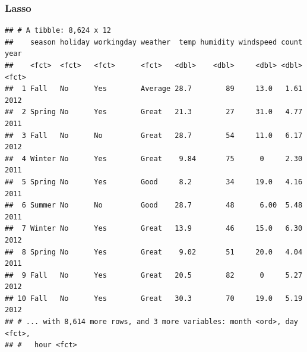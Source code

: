 \documentclass[american,]{article}
\newenvironment{Shaded}{\begin{snugshade}}{\end{snugshade}}
\newcommand{\DecValTok}[1]{\textcolor[rgb]{0.00,0.00,0.81}{#1}}
\newcommand{\FloatTok}[1]{\textcolor[rgb]{0.00,0.00,0.81}{#1}}
\newcommand{\KeywordTok}[1]{\textcolor[rgb]{0.13,0.29,0.53}{\textbf{#1}}}
\newcommand{\NormalTok}[1]{#1}
\newcommand{\OperatorTok}[1]{\textcolor[rgb]{0.81,0.36,0.00}{\textbf{#1}}}
\newcommand{\OtherTok}[1]{\textcolor[rgb]{0.56,0.35,0.01}{#1}}
\newcommand{\StringTok}[1]{\textcolor[rgb]{0.31,0.60,0.02}{#1}}
\begin{document}
\hypertarget{lasso}{%
\subsubsection{Lasso}\label{lasso}}

\begin{Shaded}
\end{Shaded}

\begin{verbatim}
## # A tibble: 8,624 x 12
##    season holiday workingday weather  temp humidity windspeed count year 
##    <fct>  <fct>   <fct>      <fct>   <dbl>    <dbl>     <dbl> <dbl> <fct>
##  1 Fall   No      Yes        Average 28.7        89     13.0   1.61 2012 
##  2 Spring No      Yes        Great   21.3        27     31.0   4.77 2011 
##  3 Fall   No      No         Great   28.7        54     11.0   6.17 2012 
##  4 Winter No      Yes        Great    9.84       75      0     2.30 2011 
##  5 Spring No      Yes        Good     8.2        34     19.0   4.16 2011 
##  6 Summer No      No         Good    28.7        48      6.00  5.48 2011 
##  7 Winter No      Yes        Great   13.9        46     15.0   6.30 2012 
##  8 Spring No      Yes        Great    9.02       51     20.0   4.04 2011 
##  9 Fall   No      Yes        Great   20.5        82      0     5.27 2012 
## 10 Fall   No      Yes        Great   30.3        70     19.0   5.19 2012 
## # ... with 8,614 more rows, and 3 more variables: month <ord>, day <fct>,
## #   hour <fct>
\end{verbatim}
\end{document}
